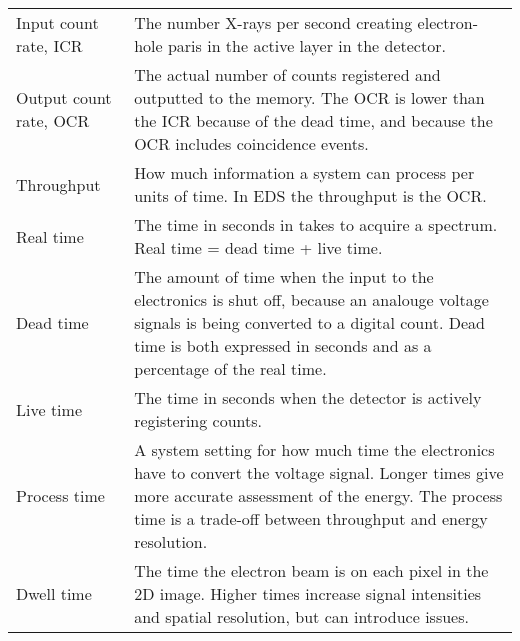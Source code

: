 \begin{table}[pht]
\begin{center}
\begin{tabular}{p{2.6cm}p{12cm}}
            Input count rate, ICR             & The number X-rays per second creating electron-hole paris in the active layer in the detector.                                                                                                                             \\
            Output count rate, OCR            & The actual number of counts registered and outputted to the memory. The OCR is lower than the ICR because of the dead time, and because the OCR includes coincidence events.                                               \\
            Throughput                        & How much information a system can process per units of time. In EDS the throughput is the OCR.                                                                                                                             \\
            Real time                         & The time in seconds in takes to acquire a spectrum. Real time = dead time + live time.                                                                                                                                     \\
            Dead time                         & The amount of time when the input to the electronics is shut off, because an analouge voltage signals is being converted to a digital count. Dead time is both expressed in seconds and as a percentage of the real time.  \\
            Live time                         & The time in seconds when the detector is actively registering counts.                                                                                                                                                      \\
            Process time                      & A system setting for how much time the electronics have to convert the voltage signal. Longer times give more accurate assessment of the energy. The process time is a trade-off between throughput and energy resolution. \\
            Dwell time                        & The time the electron beam is on each pixel in the 2D image. Higher times increase signal intensities and spatial resolution, but can introduce issues.                                                                    \\
            \hline
        \end{tabular}
    \end{center}
\end{table}